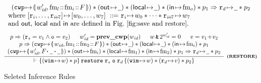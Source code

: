 \begin{figure*}[!thp]
{\begin{minipage}{1\linewidth}
\[\begin{array}{l}
{\begin{array}{c}
						\left(\frmst{\cwp'}
                                    {\fm_l \stCons \fm_i \stCons \Wstack}\right) *
						\Regs{\notCare}{\notCare}{\fm_o} * p_1
						\Rightarrow \regst{\reg{d}}{\notCare} * p_2
					\end{array}		
				}
            \\
            \text{where }[\reg{i},\dots,\reg{i\!+\!7}]\pto [\word_0,\dots,\word_7]
             \ \define \ \reg{i}\pto\word_0 * \dots * \reg{i\!+\!7}\pto\word_7 \\
            \mbox{and $\outRN$, $\localRN$ and $\inRN$ are defined in
            Fig.~\ref{fig:save and restore}.}
            \end{array}
			\]
%
%
%
			\[
				\infer[\tinybftext{(RESTORE)}]
				{
					\wfins{(\regst{\regwim}{\word}) * p}
					{\crestore \; \reg{s} \; \oexp \; \reg{d}}
					{(\regst{\regwim}{\word}) *
					(\regst{\reg{d}}{\val}) * p_2}
				}
				{
					\begin{array}{c}
						p \Rightarrow
                           (\reg{s} = \val_1 \wedge \oexp = \val_2) \quad \; \;
						\cwp' = \postcwp(\cwp) \quad \; \;
						\word \,\bitAND\, 2^{\cwp'} = 0 \quad \;\;
						\val = \val_1\!+\!\val_2\\
						p \Rightarrow
						\left(\frmst{\cwp}
                                    {\fm_1 \stCons \fm_2\stCons \Wstack} \right) *
						(\OutRegs{\notCare})
                        * (\LocalRegs{\notCare}) * (\InRegs{\fm_i})
                        * p_1 \\
						\left(\frmst{\cwp'}{\Wstack
                                            \lstApp\, \notCare \,
                                            \lstApp\, \notCare}\right) *
						\Regs{\fm_i}{\fm_1}{\fm_2} * p_1 \Rightarrow
						\regst{\reg{d}}{\notCare} * p_2
					\end{array}
				}
			\]
		\end{minipage}
	}
	
	\caption{Seleted Inference Rules}
	\label{fig:Seleted Inference rules}
	\vspace{-0.2em}
\end{figure*}

